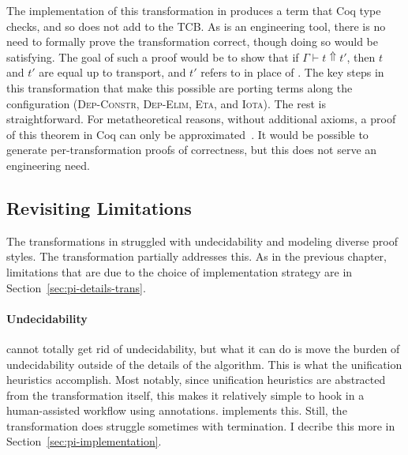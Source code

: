 The implementation of this transformation in \toolnamec produces a term that Coq type checks, and so does not
add to the TCB.
As \toolnamec is an engineering tool, there is no need to formally prove the transformation correct, though doing so would be satisfying.
The goal of such a proof would be to show that %
if $\Gamma \vdash t \Uparrow t'$,
then $t$ and $t'$ are equal up to transport, and $t'$ refers to \B in place of \Aa.
The key steps in this transformation that make this possible are porting terms along the configuration %
(\textsc{Dep-Constr}, \textsc{Dep-Elim}, \textsc{Eta}, and \textsc{Iota}).
The rest is straightforward.
For metatheoretical reasons, without additional axioms, a proof of this theorem in Coq can only be approximated~\cite{tabareau2017equivalences}.
It would be possible to generate per-transformation proofs of correctness, but this does not serve an engineering need.

\subsection{Revisiting Limitations}
\label{sec:pi-trans-limitations}

The transformations in \sysname struggled with undecidability and modeling diverse proof styles.
The \toolnamec transformation partially addresses this.
As in the previous chapter, limitations that are due to the choice of implementation strategy are in Section~\ref{sec:pi-details-trans}.

\paragraph{Undecidability}
\toolnamec cannot totally get rid of undecidability, but what it can do is move
the burden of undecidability outside of the details of the algorithm.
This is what the unification heuristics accomplish.
Most notably, since unification heuristics are abstracted from the transformation itself,
this makes it relatively simple to hook in a human-assisted workflow using annotations.
\toolnamec implements this.
Still, the \toolnamec transformation does struggle sometimes with termination.
I decribe this more in Section~\ref{sec:pi-implementation}.

